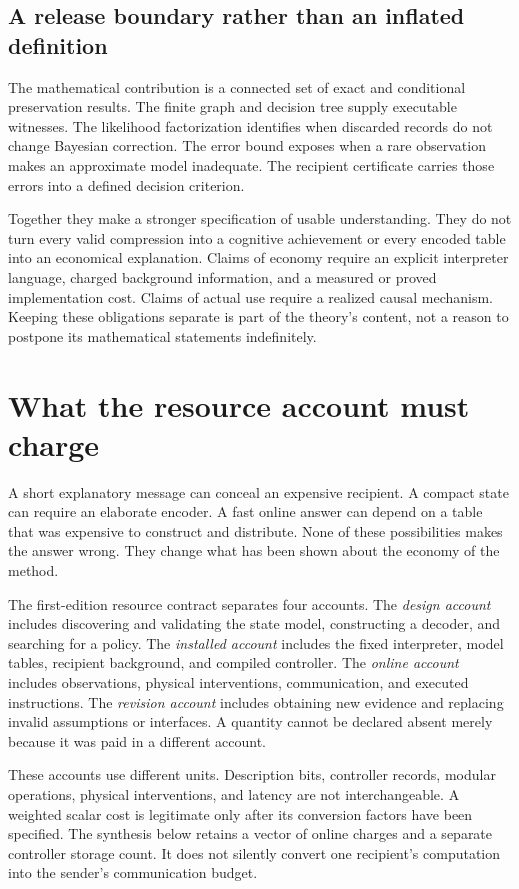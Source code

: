 \subsection{A release boundary rather than an inflated definition}
The mathematical contribution is a connected set of exact and conditional preservation results. The finite graph and decision tree supply executable witnesses. The likelihood factorization identifies when discarded records do not change Bayesian correction. The error bound exposes when a rare observation makes an approximate model inadequate. The recipient certificate carries those errors into a defined decision criterion.

Together they make a stronger specification of usable understanding. They do not turn every valid compression into a cognitive achievement or every encoded table into an economical explanation. Claims of economy require an explicit interpreter language, charged background information, and a measured or proved implementation cost. Claims of actual use require a realized causal mechanism. Keeping these obligations separate is part of the theory's content, not a reason to postpone its mathematical statements indefinitely.


\section{What the resource account must charge}\label{MU:sec:resources}
A short explanatory message can conceal an expensive recipient. A compact state can require an elaborate encoder. A fast online answer can depend on a table that was expensive to construct and distribute. None of these possibilities makes the answer wrong. They change what has been shown about the economy of the method.

The first-edition resource contract separates four accounts. The \emph{design account} includes discovering and validating the state model, constructing a decoder, and searching for a policy. The \emph{installed account} includes the fixed interpreter, model tables, recipient background, and compiled controller. The \emph{online account} includes observations, physical interventions, communication, and executed instructions. The \emph{revision account} includes obtaining new evidence and replacing invalid assumptions or interfaces. A quantity cannot be declared absent merely because it was paid in a different account.

These accounts use different units. Description bits, controller records, modular operations, physical interventions, and latency are not interchangeable. A weighted scalar cost is legitimate only after its conversion factors have been specified. The synthesis below retains a vector of online charges and a separate controller storage count. It does not silently convert one recipient's computation into the sender's communication budget.

